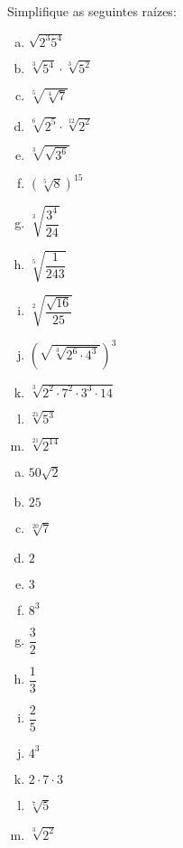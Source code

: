 \begin{exer}
Simplifique as seguintes raízes:
\begin{multicols}{2}
\begin{enumerate}[a)]
\item $\sqrt{2^3 5^4}$
\item $\sqrt[3]{5^4} \cdot \sqrt[3]{5^2}$
\item $\sqrt[5]{\sqrt[4]{7}}$
\item $\sqrt[6]{2^5} \cdot \sqrt[12]{2^2}$
\item $\sqrt[3]{\sqrt{3^6}}$
\item $(\sqrt[5]{8})^{15}$
\item $\sqrt[3]{\dfrac{3^4}{24}}$
\item $\sqrt[5]{\dfrac{1}{243}}$
\item $\sqrt[2]{\dfrac{\sqrt{16}}{25}}$
\item $(\sqrt{\sqrt[3]{2^6 \cdot 4^3}})^3$
\item $\sqrt[3]{2^2 \cdot 7^2 \cdot 3^3 \cdot 14}$
\item $\sqrt[21]{5^3}$
\item $\sqrt[21]{2^{14}}$
\end{enumerate}
\end{multicols}
\end{exer}
\begin{resp}
\begin{multicols}{4}
\begin{enumerate}[a)]
\item $50\sqrt{2}$
\item $25$
\item $\sqrt[20]{7}$
\item $2$
\item $3$
\item $8^3$
\item $\dfrac{3}{2}$
\item $\dfrac{1}{3}$
\item $\dfrac{2}{5}$
\item $4^3$
\item $2 \cdot 7 \cdot 3$
\item $\sqrt[7]{5}$
\item $\sqrt[3]{2^{2}}$
\end{enumerate}
\end{multicols}
\end{resp}

